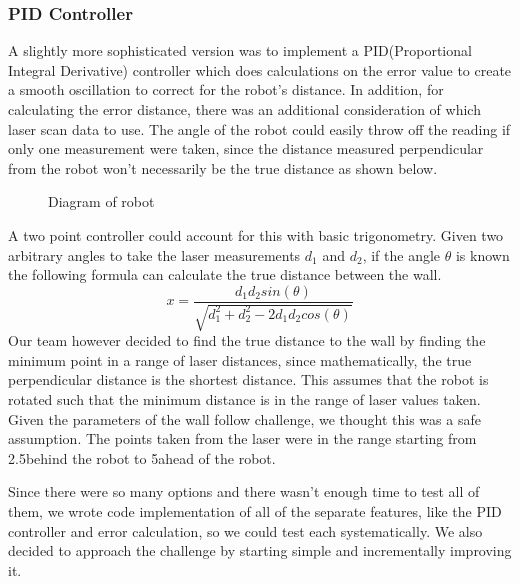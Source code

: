 \documentclass[journal, a4paper]{IEEEtran}
\begin{document}
\subsubsection{PID Controller}A slightly more sophisticated version was to implement a PID(Proportional Integral Derivative) controller which does calculations on the error value to create a smooth oscillation to correct for the robot’s distance. In addition, for calculating the error distance, there was an additional consideration of which laser scan data to use. The angle of the robot could easily throw off the reading if only one measurement were taken, since the distance measured perpendicular from the robot won't necessarily be the true distance as shown below. \\ 
\begin{figure}[H]
\centering
{}
\caption{Diagram of robot}
\end{figure}
A two point controller could account for this with basic trigonometry. Given two arbitrary angles to take the laser measurements $d_1$ and $d_2$, if the angle $\theta$ is known the following formula can calculate the true distance between the wall.  
\begin{equation}
x = \frac{d_1d_2sin(\theta)}{\sqrt{d_1^2+d_2^2-2d_1d_2cos(\theta)}}
\end{equation}
Our team however decided to find the true distance to the wall by finding the minimum point in a range of laser distances, since mathematically, the true perpendicular distance is the shortest distance. This assumes that the robot is rotated such that the minimum distance is in the range of laser values taken. Given the parameters of the wall follow challenge, we thought this was a safe assumption. The points taken from the laser were in the range starting from 2.5\degree behind the robot to 5\degree ahead of the robot.
\par Since there were so many options and there wasn’t enough time to test all of them, we wrote code implementation of all of the separate features, like the PID controller and error calculation, so we could test each systematically. We also decided to approach the challenge by starting simple and incrementally improving it.
\end{document}
